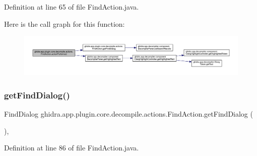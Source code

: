 Definition at line 65 of file Find\+Action.\+java.

Here is the call graph for this function\+:
\nopagebreak
\begin{figure}[H]
\begin{center}
\leavevmode
\includegraphics[width=350pt]{classghidra_1_1app_1_1plugin_1_1core_1_1decompile_1_1actions_1_1_find_action_a047e89d039f5e9c44916d7d309cb9fea_cgraph}
\end{center}
\end{figure}
\mbox{\label{classghidra_1_1app_1_1plugin_1_1core_1_1decompile_1_1actions_1_1_find_action_a56f348b40820d2f851835e40637cef93}} 
\subsubsection{\texorpdfstring{getFindDialog()}{getFindDialog()}}
{\footnotesize\ttfamily Find\+Dialog ghidra.\+app.\+plugin.\+core.\+decompile.\+actions.\+Find\+Action.\+get\+Find\+Dialog (\begin{DoxyParamCaption}{ }\end{DoxyParamCaption})\hspace{0.3cm}{\ttfamily [inline]}, {\ttfamily [protected]}}



Definition at line 86 of file Find\+Action.\+java.

